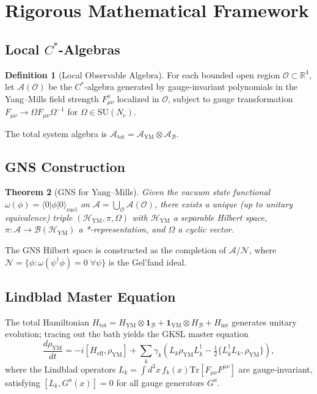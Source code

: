 \documentclass[aps,prd,reprint,superscriptaddress,floatfix]{revtex4-2}
\newtheorem{theorem}{Theorem}[section]
\theoremstyle{definition}
\newtheorem{definition}[theorem]{Definition}
\newcommand{\YM}{\mathrm{YM}}
\newcommand{\bath}{\mathcal{B}}
\newcommand{\hilb}{\mathscr{H}}
\newcommand{\Traza}{\mathrm{Tr}}
\newcommand{\eff}{_{\mathrm{eff}}}
\begin{document}
\section{Rigorous Mathematical Framework}
\label{sec:math}

\subsection{Local $C^*$-Algebras}

\begin{definition}[Local Observable Algebra]
For each bounded open region $\mathcal{O}\subset\mathbb{R}^4$, let
$\mathcal{A}(\mathcal{O})$ be the $C^*$-algebra generated by
gauge-invariant polynomials in the Yang--Mills field strength $F_{\mu\nu}^a$
localized in $\mathcal{O}$, subject to gauge transformation
$F_{\mu\nu}\to\Omega F_{\mu\nu}\Omega^{-1}$ for $\Omega\in\mathrm{SU}(N_c)$.
\end{definition}

The total system algebra is $\mathcal{A}_{\mathrm{tot}}
=\mathcal{A}_\YM\otimes\mathcal{A}_\bath$.

\subsection{GNS Construction}

\begin{theorem}[GNS for Yang--Mills]
\label{thm:GNS}
Given the vacuum state functional $\omega(\phi)=\langle 0|\phi|0\rangle_{\mathrm{eucl}}$
on $\mathcal{A}=\bigcup_{\mathcal{O}}\mathcal{A}(\mathcal{O})$, there exists
a unique (up to unitary equivalence) triple $(\hilb_\YM,\pi,\Omega)$ with
$\hilb_\YM$ a separable Hilbert space, $\pi:\mathcal{A}\to
\mathcal{B}(\hilb_\YM)$ a *-representation, and $\Omega$ a cyclic vector.
\end{theorem}

The GNS Hilbert space is constructed as the completion of
$\mathcal{A}/\mathcal{N}$, where $\mathcal{N}=\{\phi:\omega(\psi^\dagger\phi)
=0\;\forall\psi\}$ is the Gel'fand ideal.

\subsection{Lindblad Master Equation}

The total Hamiltonian
$H_{\mathrm{tot}}=H_\YM\otimes\mathbf{1}_\bath+\mathbf{1}_\YM\otimes
H_\bath+H_{\mathrm{int}}$ generates unitary evolution; tracing out the bath
yields the GKSL master equation
\begin{equation}
  \frac{d\rho_\YM}{dt} = -i[H\eff,\rho_\YM]
  + \sum_k\gamma_k\!\left(L_k\rho_\YM L_k^\dagger
  -\tfrac{1}{2}\{L_k^\dagger L_k,\rho_\YM\}\right),
  \label{eq:lindblad}
\end{equation}
where the Lindblad operators $L_k=\int d^3x\,f_k(x)
\Traza[F_{\mu\nu}F^{\mu\nu}]$ are gauge-invariant, satisfying
$[L_k,G^a(x)]=0$ for all gauge generators $G^a$.
\end{document}
